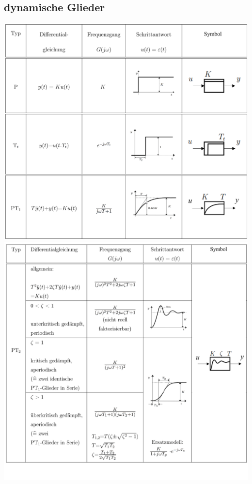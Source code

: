 	\subsection{dynamische Glieder }
		\includegraphics[width=13.5 cm]{./bilder/grundglieder/glieder1.png} \\
		\includegraphics[width=13.5 cm]{./bilder/grundglieder/glieder2.png} \\
